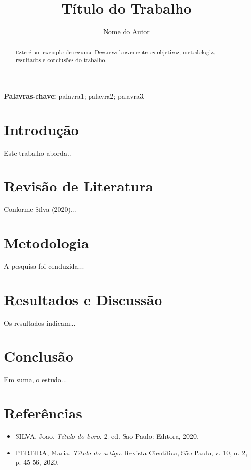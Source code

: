 \documentclass[12pt]{article}
\begin{document}
\title{Título do Trabalho}
\author{Nome do Autor}
\date{}
\maketitle

\begin{abstract}
  Este é um exemplo de resumo. Descreva brevemente os objetivos, metodologia, resultados e conclusões do trabalho.
\end{abstract}

\textbf{Palavras-chave:} palavra1; palavra2; palavra3.

\section{Introdução}
Este trabalho aborda...

\section{Revisão de Literatura}
Conforme Silva (2020)...

\section{Metodologia}
A pesquisa foi conduzida...

\section{Resultados e Discussão}
Os resultados indicam...

\section{Conclusão}
Em suma, o estudo...

\section*{Referências}
\begin{itemize}
  \item SILVA, João. \textit{Título do livro}. 2. ed. São Paulo: Editora, 2020.
  \item PEREIRA, Maria. \textit{Título do artigo}. Revista Científica, São Paulo, v. 10, n. 2, p. 45-56, 2020.
\end{itemize}
\end{document}
